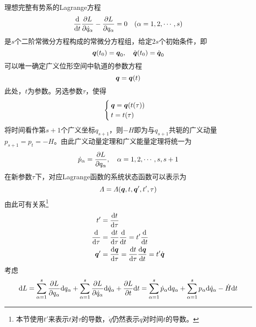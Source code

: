 理想完整有势系的Lagrange方程
\begin{equation}
	\frac{\mathrm{d}}{\mathrm{d} t} \frac{\partial L}{\partial \dot{q}_\alpha} - \frac{\partial L}{\partial q_\alpha} = 0 \quad (\alpha = 1,2,\cdots,s)
\end{equation}
是$s$个二阶常微分方程构成的常微分方程组，给定$2s$个初始条件，即
\begin{equation*}
	\boldsymbol{q}(t_0) = \boldsymbol{q}_0,\quad \dot{\boldsymbol{q}}(t_0) = \dot{\boldsymbol{q}}_0
\end{equation*}
可以唯一确定广义位形空间中轨道的参数方程
\begin{equation*}
	\boldsymbol{q} = \boldsymbol{q}(t)
\end{equation*}
此处，$t$为参数。另选参数$\tau$，使得
\begin{equation*}
	\begin{cases}
		\boldsymbol{q} = \boldsymbol{q}(t(\tau)) \\
		t = t(\tau)
	\end{cases}
\end{equation*}
将时间看作第$s+1$个广义坐标$q_{s+1}$，则$-H$即为与$q_{s+1}$共轭的广义动量$p_{s+1} = p_t = -H$。由此广义动量定理和广义能量定理将统一为
\begin{equation*}
	\dot{p}_\alpha = \frac{\partial L}{\partial q_\alpha},\quad \alpha = 1,2,\cdots,s,s+1
\end{equation*}
在新参数$\tau$下，对应Lagrange函数的系统状态函数可以表示为
\begin{equation*}
	\varLambda = \varLambda(\boldsymbol{q},t,\boldsymbol{q}',t',\tau)
\end{equation*}
由此可有关系\footnote{本节使用$t'$来表示$t$对$\tau$的导数，$\dot{q}$仍然表示$q$对时间$t$的导数。}
\begin{align*}
	t' &= \frac{\mathrm{d} t}{\mathrm{d} \tau} \\
	\frac{\mathrm{d}}{\mathrm{d} \tau} & = \frac{\mathrm{d} t}{\mathrm{d} \tau} \frac{\mathrm{d}}{\mathrm{d} t} = t' \frac{\mathrm{d}}{\mathrm{d} t} \\
	\boldsymbol{q}' &= \frac{\mathrm{d} \boldsymbol{q}}{\mathrm{d} \tau} = \frac{\mathrm{d} t}{\mathrm{d} \tau} \frac{\mathrm{d} \boldsymbol{q}}{\mathrm{d} t} = t' \dot{\boldsymbol{q}}
\end{align*}
考虑
\begin{equation*}
	\mathrm{d} L = \sum_{\alpha=1}^s \frac{\partial L}{\partial q_\alpha} \mathrm{d} q_\alpha + \sum_{\alpha=1}^s \frac{\partial L}{\partial \dot{q}_\alpha} \mathrm{d} \dot{q}_\alpha + \frac{\partial L}{\partial t} \mathrm{d} t = \sum_{\alpha=1}^s \dot{p}_\alpha \mathrm{d} q_\alpha + \sum_{\alpha=1}^s p_\alpha \mathrm{d} \dot{q}_\alpha - \dot{H} \mathrm{d} t
\end{equation*}
